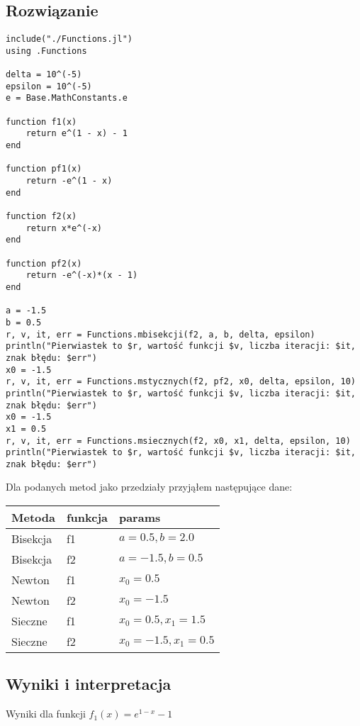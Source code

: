 \documentclass{article}
\begin{document}
\subsection{Rozwiązanie}
\begin{verbatim}
include("./Functions.jl")
using .Functions

delta = 10^(-5)
epsilon = 10^(-5)
e = Base.MathConstants.e

function f1(x)
    return e^(1 - x) - 1
end

function pf1(x)
    return -e^(1 - x)
end

function f2(x)
    return x*e^(-x)
end

function pf2(x)
    return -e^(-x)*(x - 1)
end

a = -1.5
b = 0.5
r, v, it, err = Functions.mbisekcji(f2, a, b, delta, epsilon)
println("Pierwiastek to $r, wartość funkcji $v, liczba iteracji: $it, znak błędu: $err")
x0 = -1.5
r, v, it, err = Functions.mstycznych(f2, pf2, x0, delta, epsilon, 10)
println("Pierwiastek to $r, wartość funkcji $v, liczba iteracji: $it, znak błędu: $err")
x0 = -1.5
x1 = 0.5
r, v, it, err = Functions.msiecznych(f2, x0, x1, delta, epsilon, 10)
println("Pierwiastek to $r, wartość funkcji $v, liczba iteracji: $it, znak błędu: $err")
\end{verbatim}
Dla podanych metod jako przedziały przyjąłem następujące dane:

\setlength{\tabcolsep}{2pt}
\renewcommand{\arraystretch}{1.6}
\begin{tabularx}{\textwidth}{|l|l|X|}
\hline
Metoda & funkcja & params \\
\hline
Bisekcja & f1 & $a=0.5, b = 2.0$ \\
\hline
Bisekcja & f2 & $a=-1.5, b = 0.5$ \\
\hline
Newton & f1 & $x_0 = 0.5$ \\
\hline
Newton & f2 & $x_0 = -1.5$ \\
\hline
Sieczne & f1 & $x_0 = 0.5, x_1 = 1.5$ \\
\hline
Sieczne & f2 & $x_0 = -1.5, x_1 = 0.5$ \\
\hline
\end{tabularx}
\vspace{15pt}
\subsection{Wyniki i interpretacja}
\vspace{10pt}
Wyniki dla funkcji $f_1(x) = e^{1 - x} - 1$ \\
\end{document}
